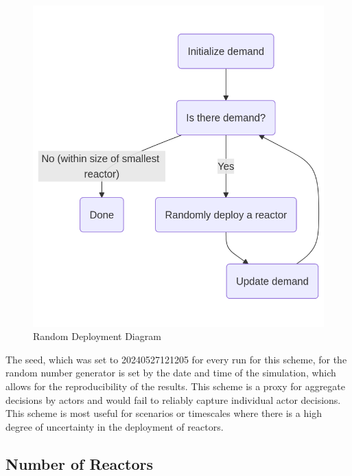 \begin{figure}[H]
    \centering
    \includegraphics[scale=0.4]{images/schemes/random_diagram.png}
    \caption{Random Deployment Diagram}
    \label{fig:random_diagram}
\end{figure}

The seed, which was set to 20240527121205 for every run for this scheme, for
the random number generator is set by the date and time of the simulation,
which allows for the reproducibility of the results. This scheme is a proxy for
aggregate decisions by actors and would fail to reliably capture individual
actor decisions. This scheme is most useful for scenarios or timescales where
there is a high degree of uncertainty in the deployment of reactors.


\subsection{Number of Reactors}
\label{sec:random_reactors}


